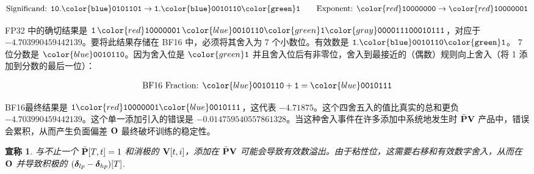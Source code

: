 \documentclass{article} %
\newtheorem{claim}{宣称}
\begin{document}
\begin{tcolorbox}[colback=black!5!white,
  colframe=black,
  boxrule=0.5pt,
  width=0.95\linewidth,
  arc=4pt,
  boxsep=1pt,
  halign=center,
  top=0pt,
  bottom=0.5pt,
  center]
\vspace{-4pt}
\begin{align*}
  \text{Significand: } \mathtt{10.{\color{blue}0101101}} \to \mathtt{1.{\color{blue}0010110}{\color{green}1}} \quad \quad
  \text{Exponent: } {\color{red}\mathtt{10000000}} \to {\color{red}\mathtt{10000001}}
\end{align*}
\end{tcolorbox}
FP32 中的确切结果是 $\mathtt{1}\,{\color{red}\mathtt{10000001}}\,{\color{blue}\mathtt{0010110}}{\color{green}\mathtt{1}}{\color{gray}\mathtt{000011100010111}}$，对应于 $-4.703990459442139$。要将此结果存储在 BF16 中，必须将其舍入为 7 个小数位。有效数是 $\mathtt{1.{\color{blue}0010110}{\color{green}1}}$。 7 位分数是 ${\color{blue}\mathtt{0010110}}$。因为舍入位是 ${\color{green}\mathtt{1}}$ 并且舍入位后有非零位，舍入到最接近的（偶数）规则向上舍入（将 1 添加到分数的最后一位）：
\begin{tcolorbox}[colback=black!5!white,
  colframe=black,
  boxrule=0.5pt,
  width=0.95\linewidth,
  arc=4pt,
  boxsep=1pt,
  halign=center,
  top=0pt,
  bottom=0.5pt,
  center]
\vspace{-4pt}
  \begin{align*}
  \text{BF16 Fraction: } {\color{blue}\mathtt{0010110}} + \mathtt{1} = {\color{blue}\mathtt{0010111}}
\end{align*}
\end{tcolorbox}
BF16最终结果是 $\mathtt{1}{\color{red}\mathtt{10000001}}{\color{blue}\mathtt{0010111}}$，这代表 $-4.71875$。这个四舍五入的值比真实的总和更负 $-4.703990459442139$。这个单一添加引入的错误是 $\mathbf{-0.014759540557861328}$。当这种舍入事件在许多添加中系统地发生时 $\bar{{\mathbf{P}}}{\mathbf{V}}$ 产品中，错误会累积，从而产生负面偏差 ${\mathbf{O}}$ 最终破坏训练的稳定性。



\begin{tcolorbox}[
  colback=cyan!5!white,
  colframe=black!100,
  boxrule=0.4pt,
  arc=3pt,
  left=5pt, right=5pt,
  top=5pt, bottom=5pt,
  width=0.95\linewidth,
  coltitle=black,
  center
]
\begin{claim}\label{claim3}
  与不止一个 $\bar{{\mathbf{P}}}[T,t]=1$ 和消极的 ${\mathbf{V}}[t, i]$，添加在 $\bar{{\mathbf{P}}}{\mathbf{V}}$ 可能会导致有效数溢出。由于粘性位，这需要右移和有效数字舍入，从而在 ${\mathbf{O}}$ 并导致积极的 $({\boldsymbol{\delta}}_{lp} - {\boldsymbol{\delta}}_{hp})[T]$.
\end{claim}
\end{tcolorbox}
\end{document}
